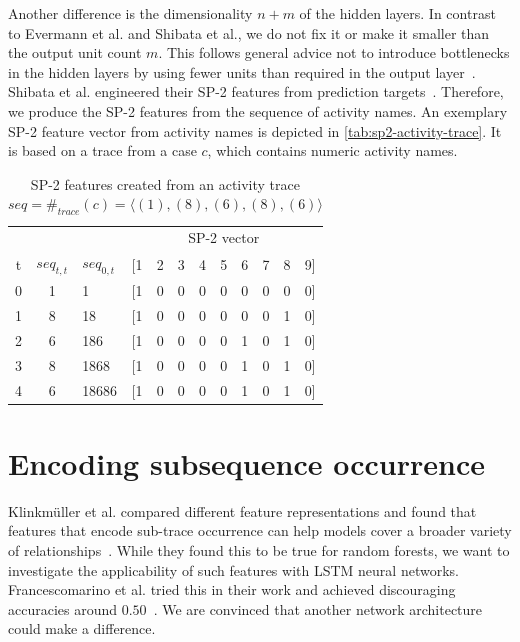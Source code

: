 Another difference is the dimensionality $n+m$ of the hidden layers.
In contrast to Evermann et al. and Shibata et al., we do not fix it or make it smaller than the output unit count $m$.
This follows general advice not to introduce bottlenecks in the hidden layers by using fewer units than required in the output layer~\cite{web:techniques-in-convnets,szegedy2016rethinking}.\\

\noindent Shibata et al. engineered their SP-2 features from prediction targets~\cite{shibata2016bipartite}.
Therefore, we produce the SP-2 features from the sequence of activity names.
An exemplary SP-2 feature vector from activity names is depicted in \autoref{tab:sp2-activity-trace}.
It is based on a trace from a case $c$, which contains numeric activity names.


\begin{table}[!htb]
    \centering
    \begin{adjustbox}{center}
    \begin{tabular}{cclccccccccc}
          &      &              & \multicolumn{9}{c}{SP-2 vector}\\
 t & $seq_{t, t}$ & $seq_{0,t}$ & [1 & 2 & 3 & 4 & 5 & 6 & 7 & 8 & 9]\\
        \midrule
        0 & 1    & 1            & [1 & 0 & 0 & 0 & 0 & 0 & 0 & 0 & 0]\\
        1 & 8    & 18           & [1 & 0 & 0 & 0 & 0 & 0 & 0 & 1 & 0]\\
        2 & 6    & 186          & [1 & 0 & 0 & 0 & 0 & 1 & 0 & 1 & 0]\\
        3 & 8    & 1868         & [1 & 0 & 0 & 0 & 0 & 1 & 0 & 1 & 0]\\
        4 & 6    & 18686        & [1 & 0 & 0 & 0 & 0 & 1 & 0 & 1 & 0]\\
    \end{tabular}
    \end{adjustbox}
    \caption[SP-2 features created from an activity trace]{SP-2 features created from an activity trace $seq=\#_{trace}(c)=\langle (1), (8), (6), (8), (6)\rangle$}
    \label{tab:sp2-activity-trace}
\end{table}


\section{Encoding subsequence occurrence}\label{sec:contrib:pfs-inspiration}
Klinkmüller et al. compared different feature representations and found that features that encode sub-trace occurrence can help models cover a broader variety of relationships~\cite{klinkmuller2018reliablemonitoring}.
While they found this to be true for random forests, we want to investigate the applicability of such features with LSTM neural networks.
Francescomarino et al. tried this in their work and achieved discouraging accuracies around $0.50$~\cite{francescomarino2017}.
We are convinced that another network architecture could make a difference.

